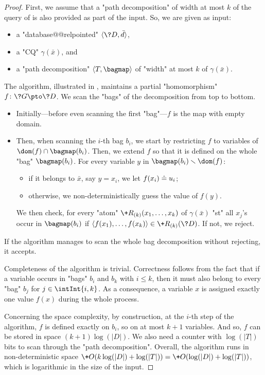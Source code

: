 \begin{proof}
	First, we assume that a "path decomposition" of width at most $k$ of the query of
	is also provided as part of the input. So, we are given as input:
	\begin{itemize}
		\item a "database@@relpointed" $\tup{\?D, \bar d}$,
		\item a "CQ" $\gamma(\bar x)$, and
		\item a "path decomposition" $\langle T, \bagmap \rangle$ of "width" at 	
			most $k$ of $\gamma(\bar x)$.
	\end{itemize}
	The algorithm, illustrated in , maintains a partial "homomorphism"
	$f\colon \?G \pto \?D$.
	We scan the "bags" of the decomposition from top to bottom.
	\begin{itemize}
		\item Initially---before even scanning the first "bag"---$f$ is the map with empty domain.
		\item Then, when scanning the $i$-th bag $b_i$,
			we start by restricting $f$ to variables of $\dom(f)\cap \bagmap(b_i)$.
			Then, we extend $f$ so that it is defined on the whole "bag" $\bagmap(b_i)$.
			For every variable $y$ in $\bagmap(b_i) \smallsetminus\dom(f)$:
			\begin{itemize}
				\item if it belongs to $\bar x$, say $y = x_i$, 
					we let $f(x_i) \mathrel{\hat{=}} u_i$;
				\item otherwise, we non-deterministically guess the value of $f(y)$.
			\end{itemize}
			We then check, for every "atom" $\+R_{(k)}(x_1,\dotsc,x_k)$ of $\gamma(\bar x)$ 
			"st" all $x_j$'s occur in $\bagmap(b_i)$ if
			$\tup{f(x_1), \dotsc, f(x_k)} \in \+R_{(k)}(\?D)$.
			If not, we reject. 
	\end{itemize}
	If the algorithm manages to scan the whole bag decomposition without rejecting, it accepts.

	Completeness of the algorithm is trivial. Correctness follows from the fact that if
	a variable occurs in "bags" $b_i$ and $b_k$ with $i \leq k$, then it must also belong to every
	"bag" $b_j$ for $j \in \intInt{i,k}$. As a consequence, a variable $x$ is assigned 
	exactly one value $f(x)$ during the whole process. 

	Concerning the space complexity,
	by construction, at the $i$-th step of the algorithm, $f$ is defined exactly on $b_i$, so on at most $k+1$ variables.
	And so, $f$ can be stored in space $(k+1)\log(|D|)$.
	We also need a counter with $\log(|T|)$ bits to scan through the "path decomposition".
	Overall, the algorithm runs in non-deterministic space
	$\+O(k\log(|D|) + \log(|T|)) = \+O(\log(|D|) + \log(|T|))$,
	which is logarithmic in the size of the input.


\end{proof}
